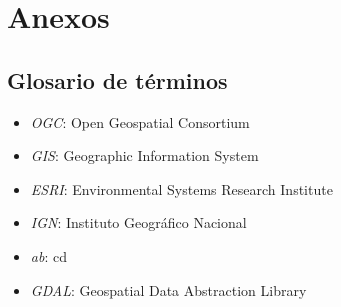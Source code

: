 \chapter{Anexos}
\section{Glosario de términos}
\begin{itemize}
    \item \textit{OGC}: Open Geospatial Consortium
    \item \textit{GIS}: Geographic Information System
    \item \textit{ESRI}: Environmental Systems Research Institute
    \item \textit{IGN}: Instituto Geográfico Nacional
    \item \textit{ab}: cd
    \item \textit{GDAL}: Geospatial Data Abstraction Library
\end{itemize}





 
